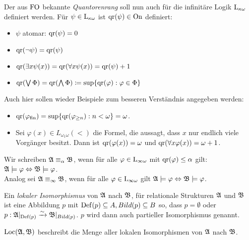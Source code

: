 \begin{definition}[Quantorenrang]
	Der aus $\operatorname{FO}$ bekannte \textit{Quantorenrang} soll nun auch für die infinitäre Logik $\operatorname{L}_{\kappa\omega}$ definiert werden. Für $\psi\in \operatorname{L}_{\kappa\omega}$ ist $\operatorname{qr}(\psi)\in \operatorname{On}$ definiert:
	\begin{itemize}
		\item $\psi$ atomar: $\operatorname{qr}(\psi)=0$
		\item $\operatorname{qr}(\neg\psi)=\operatorname{qr}(\psi)$
		\item $\operatorname{qr}(\exists x \psi(x))=\operatorname{qr}(\forall x \psi(x))=\operatorname{qr}(\psi)+1$
		\item $\operatorname{qr}(\bigvee \Phi)=\operatorname{qr}(\bigwedge \Phi)\coloneqq \sup\{\operatorname{qr}(\varphi):\varphi\in \Phi\}$
	\end{itemize}
\end{definition}

Auch hier sollen wieder Beispiele zum besseren Verständnis angegeben werden:
\begin{example}
\begin{itemize}
	\item $\operatorname{qr}(\varphi_{\operatorname{fin}})=\sup\{\operatorname{qr}(\varphi_{\geq n}): n < \omega\}=\omega$.
	\item Sei $\varphi(x)\in L_{\omega_1\omega}(<)$ die Formel, die aussagt, dass $x$ nur endlich viele Vorgänger besitzt. Dann ist $\operatorname{qr}(\varphi(x))=\omega$ und $\operatorname{qr}(\forall x \varphi(x))=\omega+1$.
\end{itemize}
\end{example}

\begin{definition}[Äquivalenzen]
	Wir schreiben $\mathfrak{A}\equiv_\alpha\mathfrak{B}$, wenn für alle $\varphi\in \operatorname{L}_{\infty\omega}$ mit $\operatorname{qr}(\varphi)\leq \alpha$ gilt: $\mathfrak{A}\models\varphi \Leftrightarrow \mathfrak{B}\models\varphi$.
	\\
	Analog sei $\mathfrak{A}\equiv_\infty\mathfrak{B}$, wenn für alle $\varphi\in \operatorname{L}_{\infty\omega}$ gilt $\mathfrak{A}\models\varphi \Leftrightarrow \mathfrak{B}\models\varphi$.
\end{definition}

\begin{definition}
	Ein \textit{lokaler Isomorphismus} von $\mathfrak{A}$ nach $\mathfrak{B}$, für relationale Strukturen $\mathfrak{A}$ und $\mathfrak{B}$ ist eine Abbildung 
	$p$ mit $\operatorname{Def}(p)\subseteq A,Bild(p)\subseteq B$ so, dass $p=\emptyset$ oder
	$p:\mathfrak{A}\vert_{\operatorname{Def}(p)}\xrightarrow{\sim}\mathfrak{B}\vert_{Bild(p)}$. 
	$p$ wird dann auch partieller Isomorphismus genannt.
	
	$\operatorname{Loc}(\mathfrak{A},\mathfrak{B})$ beschreibt die Menge aller lokalen Isomorphismen von $\mathfrak{A}$ nach $\mathfrak{B}$.
\end{definition}

